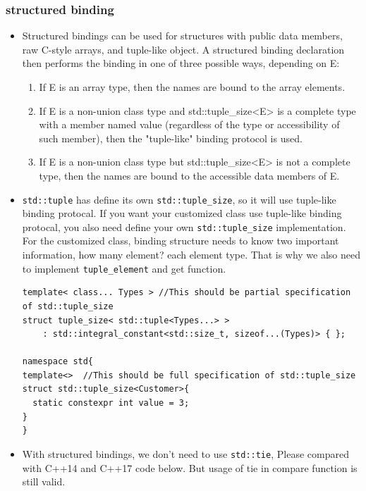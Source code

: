 \documentclass[a4paper,11pt,twoside]{book}
\begin{document}
\subsubsection{structured binding}
\begin{itemize}

    \item Structured bindings can be used for structures with public data members, raw C-style arrays, and tuple-like object. A structured binding declaration then performs the binding in one of three possible ways, depending on E:
        \begin{enumerate}
            \item If E is an array type, then the names are bound to the array elements.
            \item If E is a non-union class type and std::tuple\_size<E> is a complete type with a member named value (regardless of the type or accessibility of such member), then the "tuple-like" binding protocol is used.
            \item If E is a non-union class type but std::tuple\_size<E> is not a complete type, then the names are bound to the accessible data members of E.
        \end{enumerate}

    \item \texttt{std::tuple} has define its own \texttt{std::tuple\_size}, so it will use tuple-like binding protocal. If you want your customized class use tuple-like binding protocal, you also need define your own \texttt{std::tuple\_size} implementation. For the customized class, binding structure needs to know two important information, how many element? each element type. That is why we also need to implement \texttt{tuple\_element} and get function.

\begin{lstlisting}
template< class... Types > //This should be partial specification of std::tuple_size
struct tuple_size< std::tuple<Types...> >
    : std::integral_constant<std::size_t, sizeof...(Types)> { };

namespace std{
template<>  //This should be full specification of std::tuple_size
struct std::tuple_size<Customer>{
  static constexpr int value = 3;
}
}
\end{lstlisting}

    \item With structured bindings, we don't need to use \texttt{std::tie}, Please compared with C++14 and C++17 code below. But usage of tie in compare function is still valid.


\end{itemize}
\end{document}

